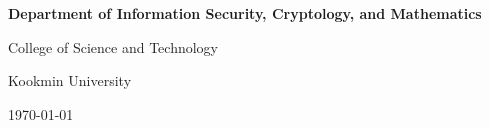 \documentclass[12pt,openany]{book}
\theoremstyle{definition}
\begin{document}
\begin{titlepage}
\begin{center}
			\vspace{1in}
			{\large\bf \textsf{Department of Information Security, Cryptology, and Mathematics}\par}
			{\textsf{College of Science and Technology}\par}
			{\textsf{Kookmin University}\par}
			\vspace{.25in}
			{\large \textsf{\today}\par}
		\end{center}
	\end{titlepage}
	
	\frontmatter
	
%	
	
	\newpage
	\tableofcontents
	
	\newpage
	\mainmatter
	
	
	
	
	
	
%	
	
	\appendix
	
%	
	
	\backmatter
	
\end{document}
